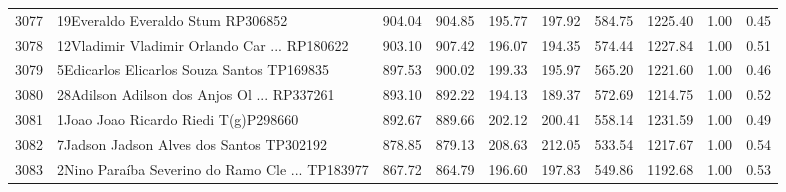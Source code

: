 \begin{table}[ht]
\begin{tabular}{rlrrrrrrrr}
  3077 & 19Everaldo Everaldo Stum RP306852 & 904.04 & 904.85 & 195.77 & 197.92 & 584.75 & 1225.40 & 1.00 & 0.45 \\ 
  3078 & 12Vladimir Vladimir Orlando Car ... RP180622 & 903.10 & 907.42 & 196.07 & 194.35 & 574.44 & 1227.84 & 1.00 & 0.51 \\ 
  3079 & 5Edicarlos Elicarlos Souza Santos TP169835 & 897.53 & 900.02 & 199.33 & 195.97 & 565.20 & 1221.60 & 1.00 & 0.46 \\ 
  3080 & 28Adilson Adilson dos Anjos Ol ... RP337261 & 893.10 & 892.22 & 194.13 & 189.37 & 572.69 & 1214.75 & 1.00 & 0.52 \\ 
  3081 & 1Joao Joao Ricardo Riedi T(g)P298660 & 892.67 & 889.66 & 202.12 & 200.41 & 558.14 & 1231.59 & 1.00 & 0.49 \\ 
  3082 & 7Jadson Jadson Alves dos Santos TP302192 & 878.85 & 879.13 & 208.63 & 212.05 & 533.54 & 1217.67 & 1.00 & 0.54 \\ 
  3083 & 2Nino Paraíba Severino do Ramo Cle ... TP183977 & 867.72 & 864.79 & 196.60 & 197.83 & 549.86 & 1192.68 & 1.00 & 0.53 \\ 
   \hline
\end{tabular}
\end{table}
